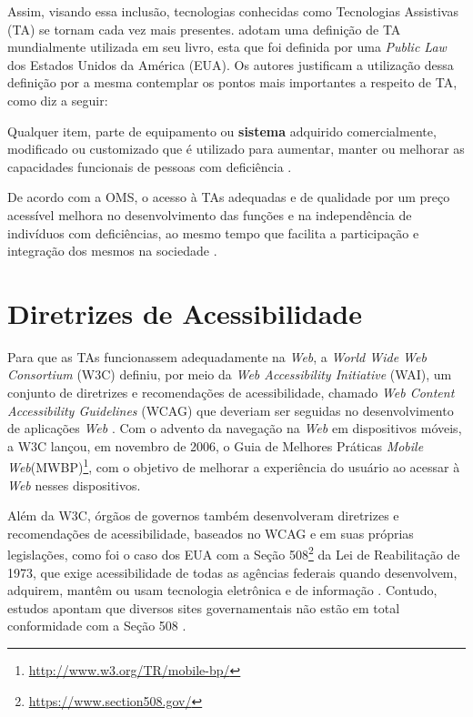 Assim, visando essa inclusão, tecnologias conhecidas como Tecnologias Assistivas (TA) se tornam cada vez mais presentes.
 adotam uma definição de TA mundialmente utilizada em seu livro, esta que foi definida por uma \textit{Public Law}
dos Estados Unidos da América (EUA). Os autores justificam a utilização dessa definição por a mesma contemplar os pontos mais
importantes a respeito de TA, como diz a seguir:

\begin{citacao}
    Qualquer item, parte de equipamento ou \textbf{sistema} adquirido comercialmente, modificado ou customizado que é utilizado para aumentar, manter ou melhorar as capacidades
    funcionais de pessoas com deficiência \cite{Cook2014}.
\end{citacao}

De acordo com a OMS, o acesso à TAs adequadas e de qualidade por um preço acessível melhora
no desenvolvimento das funções e na independência de indivíduos com deficiências, ao mesmo tempo que facilita
a participação e integração dos mesmos na sociedade \cite{world2019global}.

\section{Diretrizes de Acessibilidade}

Para que as TAs funcionassem adequadamente na \textit{Web}, a \textit{World Wide Web Consortium} (W3C) definiu, por meio da
\emph{Web Accessibility Initiative} (WAI), um conjunto de diretrizes e recomendações de acessibilidade, chamado
\emph{Web Content Accessibility Guidelines} (WCAG) que deveriam ser seguidas no desenvolvimento de aplicações \emph{Web}
\cite{W3C2019}. Com o advento da navegação na \emph{Web} em dispositivos móveis, a W3C lançou, em novembro
de 2006, o Guia de Melhores Práticas \emph{Mobile Web}(MWBP)\footnote{\url{http://www.w3.org/TR/mobile-bp/}}, com o objetivo de
melhorar a experiência do usuário ao acessar à \emph{Web} nesses dispositivos.

Além da W3C, órgãos de governos também desenvolveram diretrizes e recomendações de acessibilidade, baseados no WCAG e
em suas próprias legislações, como foi o caso dos EUA com a Seção 508\footnote{\url{https://www.section508.gov/}}
da Lei de Reabilitação de 1973, que exige acessibilidade de todas as agências federais quando desenvolvem,
adquirem, mantêm ou usam tecnologia eletrônica e de informação \cite{JAEGER2006169}. Contudo, estudos apontam que diversos
sites governamentais não estão em total conformidade com a Seção 508 \cite{KING2016715,YI201575}.


